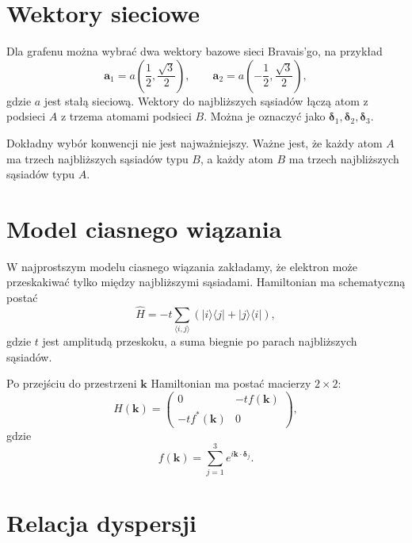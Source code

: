 \section{Wektory sieciowe}

Dla grafenu można wybrać dwa wektory bazowe sieci Bravais'go, na przykład
\begin{equation}
    \mathbf{a}_1=a\left(\frac{1}{2},\frac{\sqrt{3}}{2}\right),
    \qquad
    \mathbf{a}_2=a\left(-\frac{1}{2},\frac{\sqrt{3}}{2}\right),
\end{equation}
gdzie \(a\) jest stałą sieciową. Wektory do najbliższych sąsiadów łączą atom z podsieci \(A\) z trzema atomami podsieci \(B\). Można je oznaczyć jako \(\boldsymbol{\delta}_1,\boldsymbol{\delta}_2,\boldsymbol{\delta}_3\).

Dokładny wybór konwencji nie jest najważniejszy. Ważne jest, że każdy atom \(A\) ma trzech najbliższych sąsiadów typu \(B\), a każdy atom \(B\) ma trzech najbliższych sąsiadów typu \(A\).

\section{Model ciasnego wiązania}

W najprostszym modelu ciasnego wiązania zakładamy, że elektron może przeskakiwać tylko między najbliższymi sąsiadami. Hamiltonian ma schematyczną postać
\begin{equation}
    \hat{H}=-t\sum_{\langle i,j\rangle}\left(|i\rangle\langle j|+|j\rangle\langle i|\right),
\end{equation}
gdzie \(t\) jest amplitudą przeskoku, a suma biegnie po parach najbliższych sąsiadów.

Po przejściu do przestrzeni \(\mathbf{k}\) Hamiltonian ma postać macierzy \(2\times2\):
\begin{equation}
    H(\mathbf{k})=
    \begin{pmatrix}
    0 & -t f(\mathbf{k})\\
    -t f^*(\mathbf{k}) & 0
    \end{pmatrix},
\end{equation}
gdzie
\begin{equation}
    f(\mathbf{k})=\sum_{j=1}^{3}e^{i\mathbf{k}\cdot\boldsymbol{\delta}_j}.
\end{equation}

\section{Relacja dyspersji}

